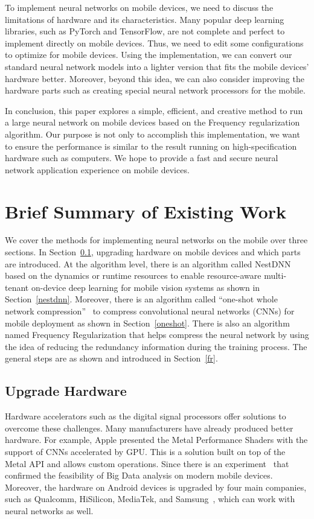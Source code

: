 \documentclass{article}
\begin{document}
To implement neural networks on mobile devices, we need to discuss the limitations of hardware and its characteristics. Many popular deep learning libraries, such as PyTorch and TensorFlow, are not complete and perfect to implement directly on mobile devices. Thus, we need to edit some configurations to optimize for mobile devices. Using the implementation, we can convert our standard neural network models into a lighter version that fits the mobile devices' hardware better. Moreover, beyond this idea, we can also consider improving the hardware parts such as creating special neural network processors for the mobile. 

In conclusion, this paper explores a simple, efficient, and creative method to run a large neural network on mobile devices based on the Frequency regularization algorithm. Our purpose is not only to accomplish this implementation, we want to ensure the performance is similar to the result running on high-specification hardware such as computers. We hope to provide a fast and secure neural network application experience on mobile devices.


\section*{Brief Summary of Existing Work}

We cover the methods for implementing neural networks on the mobile over three sections. In Section~\ref{upgrade_hardware}, upgrading hardware on mobile devices and which parts are introduced. At the algorithm level, there is an algorithm called NestDNN~\cite{fang2018nestdnn} based on the dynamics or runtime resources to enable resource-aware multi-tenant on-device deep learning for mobile vision systems as shown in Section~\ref{nestdnn}. Moreover, there is an algorithm called “one-shot whole network compression”~\cite{kim2016compression} to compress convolutional neural networks (CNNs) for mobile deployment as shown in Section~\ref{oneshot}. There is also an algorithm named Frequency Regularization that helps compress the neural network by using the idea of reducing the redundancy information during the training process. The general steps are as shown and introduced in Section~\ref{fr}.

\subsection{Upgrade Hardware}\label{upgrade_hardware}
Hardware accelerators such as the digital signal processors offer solutions to overcome these challenges. Many manufacturers have already produced better hardware. For example, Apple presented the Metal Performance Shaders with the support of CNNs accelerated by GPU. This is a solution built on top of the Metal API and allows custom operations. Since there is an experiment~\cite{akusok2019metal} that confirmed the feasibility of Big Data analysis on modern mobile devices. Moreover, the hardware on Android devices is upgraded by four main companies, such as Qualcomm, HiSilicon, MediaTek, and Samsung~\cite{Andrey2019Aibenchmark}, which can work with neural networks as well.
\end{document}
